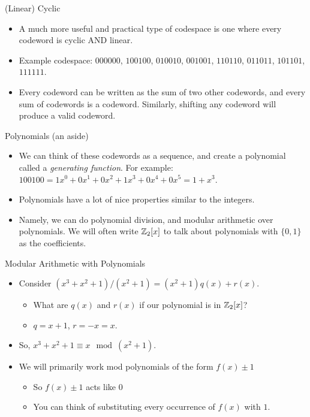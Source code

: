 \documentclass[aspectratio=169]{beamer}
\begin{document}
\begin{frame}{(Linear) Cyclic}
\begin{itemize}
    \item A much more useful and practical type of codespace is one where every codeword is cyclic AND linear. 
    \item Example codespace: $000000$, $100100$, $010010$, $001001$, $110110$, $011011$, $101101$, $111111$. \pause
    \item Every codeword can be written as the sum of two other codewords, and every sum of codewords is a codeword. Similarly, shifting any codeword will produce a valid codeword. 
\end{itemize}
\end{frame}

\begin{frame}{Polynomials (an aside)}
    \begin{itemize}
        \item We can think of these codewords as a sequence, and create a polynomial called a \emph{generating function}. For example: $100100 = 1x^0 + 0x^1 + 0x^2 + 1x^3 + 0x^4 + 0x^5 = 1 + x^3$. \pause
        \item Polynomials have a lot of nice properties similar to the integers. 
        \item Namely, we can do polynomial division, and modular arithmetic over polynomials. We will often write $\mathbb{Z}_2[x]$ to talk about polynomials with $\{0, 1\}$ as the coefficients. 
    \end{itemize}
\end{frame}

\begin{frame}{Modular Arithmetic with Polynomials}
    \begin{itemize}
        \item Consider $(x^3 + x^2 + 1) / (x^2 + 1) = (x^2 + 1)q(x) + r(x)$.  
        \begin{itemize}
            \item What are $q(x)$ and $r(x)$ if our polynomial is in $\mathbb{Z}_2[x]$? \pause
            \item $q = x + 1$, $r = -x = x$.
        \end{itemize}
        \item So, $x^3 + x^2 + 1 \equiv x \mod (x^2 + 1)$. \pause 
        \item We will primarily work mod polynomials of the form $f(x) \pm 1$
        \begin{itemize}
            \item So $f(x) \pm 1$ acts like $0$
            \item You can think of substituting every occurrence of $f(x)$ with $1$. 
        \end{itemize}
    \end{itemize}
\end{frame}
\end{document}
